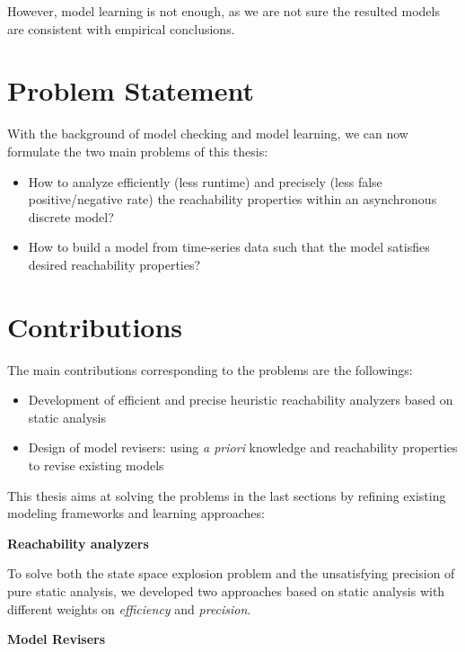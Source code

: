 However, model learning is not enough, as we are not sure the resulted models are consistent with empirical conclusions.

\section{Problem Statement}\label{sec:problemStatement}

With the background of model checking and model learning, we can now formulate the two main problems of this thesis:
\begin{itemize}
    \item How to analyze efficiently (less runtime) and precisely (less false positive/negative rate) the reachability properties within an asynchronous discrete model?
    
    \item How to build a model from time-series data such that the model satisfies desired reachability properties?
    
    
\end{itemize}



\section{Contributions}\label{sec:contribution}
The main contributions corresponding to the problems are the followings:
\begin{itemize}
    \item Development of efficient and precise heuristic reachability analyzers based on static analysis~\cite{chai2018reach}
    \item Design of model revisers: using \textit{a priori} knowledge and reachability properties to revise existing models
\end{itemize}

This thesis aims at solving the problems in the last sections by refining existing modeling frameworks and learning approaches:

\textbf{Reachability analyzers}

To solve both the state space explosion problem and the unsatisfying precision of pure static analysis, we developed two approaches based on static analysis with different weights on \textit{efficiency} and \textit{precision}.

\textbf{Model Revisers}

